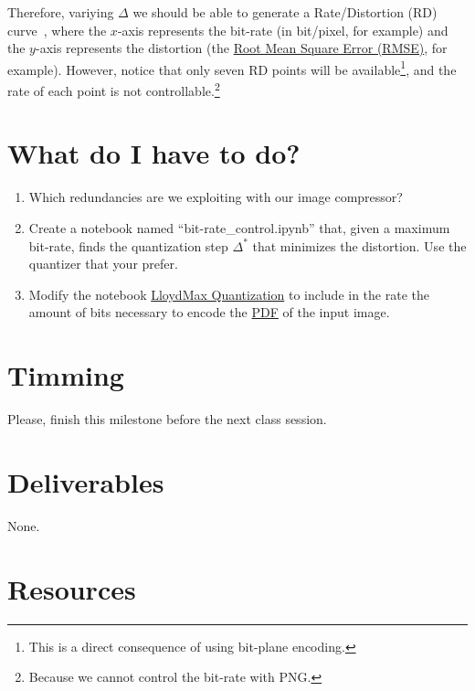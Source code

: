 Therefore, variying $\Delta$ we should be able to generate a Rate/Distortion (RD)
curve~\cite{vruiz__information_theory}, where the $x$-axis represents the bit-rate (in bit/pixel, for
example) and the $y$-axis represents the distortion (the
\href{https://en.wikipedia.org/wiki/Root-mean-square_deviation}{Root
  Mean Square Error (RMSE)}, for example). However, notice that only seven RD points will be available\footnote{This is a direct consequence of using bit-plane encoding.}, and the rate of each point is not controllable.\footnote{Because we cannot control the bit-rate with PNG.}

\section{What do I have to do?}
\begin{enumerate}
\item Which redundancies are we exploiting with our image compressor? 
\item Create a notebook named ``bit-rate\_control.ipynb'' that, given
  a maximum bit-rate, finds the quantization step $\Delta^*$ that
  minimizes the distortion. Use the quantizer that your prefer.
\item Modify the notebook
  \href{https://github.com/Sistemas-Multimedia/Sistemas-Multimedia.github.io/blob/master/contents/scalar_quantization/LloydMax.ipynb}{LloydMax
    Quantization} to include in the rate the amount of bits necessary
  to encode the
  \href{https://en.wikipedia.org/wiki/Probability_density_function}{PDF}
  of the input image.
\end{enumerate}

\section{Timming}
Please, finish this milestone before the next class session.

\section{Deliverables}
None.

\section{Resources}
\renewcommand{\addcontentsline}[3]{} %

